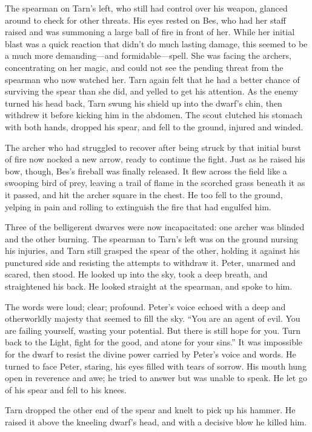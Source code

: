 The spearman on Tarn's left, who still had control over his weapon, glanced around to check for other threats.  His eyes rested on Bes, who had her staff raised and was summoning a large ball of fire in front of her.  While her initial blast was a quick reaction that didn't do much lasting damage, this seemed to be a much more demanding---and formidable---spell.  She was facing the archers, concentrating on her magic, and could not see the pending threat from the spearman who now watched her.  Tarn again felt that he had a better chance of surviving the spear than she did, and yelled to get his attention.  As the enemy turned his head back, Tarn swung his shield up into the dwarf's chin, then withdrew it before kicking him in the abdomen.  The scout clutched his stomach with both hands, dropped his spear, and fell to the ground, injured and winded.

The archer who had struggled to recover after being struck by that initial burst of fire now nocked a new arrow, ready to continue the fight.  Just as he raised his bow, though, Bes's fireball was finally released.  It flew across the field like a swooping bird of prey, leaving a trail of flame in the scorched grass beneath it as it passed, and hit the archer square in the chest.  He too fell to the ground, yelping in pain and rolling to extinguish the fire that had engulfed him.

Three of the belligerent dwarves were now incapacitated: one archer was blinded and the other burning.  The spearman to Tarn's left was on the ground nursing his injuries, and Tarn still grasped the spear of the other, holding it against his punctured side and resisting the attempts to withdraw it.  Peter, unarmed and scared, then stood.  He looked up into the sky, took a deep breath, and straightened his back.  He looked straight at the spearman, and spoke to him.

The words were loud; clear; profound.  Peter's voice echoed with a deep and otherworldly majesty that seemed to fill the sky.   ``You are an agent of evil.  You are failing yourself, wasting your potential.  But there is still hope for you.  Turn back to the Light, fight for the good, and atone for your sins.'' It was impossible for the dwarf to resist the divine power carried by Peter's voice and words.  He turned to face Peter, staring, his eyes filled with tears of sorrow.  His mouth hung open in reverence and awe; he tried to answer but was unable to speak.  He let go of his spear and fell to his knees.

Tarn dropped the other end of the spear and knelt to pick up his hammer.  He raised it above the kneeling dwarf's head, and with a decisive blow he killed him.

